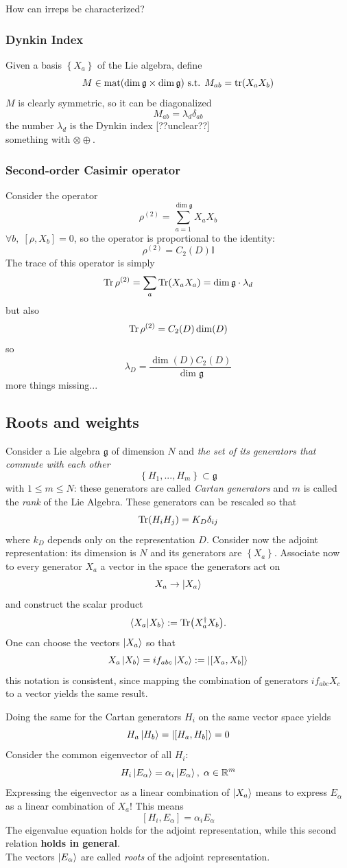 How can irreps be characterized?

\subsubsection{Dynkin Index}
Given a basis $\left\{X_a\right\}$ of the Lie algebra, define
\[
    M\in\text{mat}(\dim\mathfrak{g}\times \dim\mathfrak{g})\text{ s.t. }M_{ab}=
    \tr(X_aX_b)
\]
$M$ is clearly symmetric, so it can be diagonalized
\[
    M_{ab} = \lambda_d\delta_{ab}
\]
the number $\lambda_d$ is the Dynkin index [??unclear??]\\
something with $\otimes\oplus$.
\subsubsection{Second-order Casimir operator}
Consider the operator
\[
    \rho^{(2)} = \sum_{a=1}^{\dim\mathfrak{g}}X_aX_b
\]
$\forall b,\; \left[\rho,X_b\right]=0$, so the operator is proportional to the
identity:
\[
    \rho^{(2)}=C_2(D)\mathbb{I} 
\]
The trace of this operator is simply
\[
    \Tr\rho^{\left(2\right)} = \sum_{a}\Tr(X_aX_a) =\dim\mathfrak{g}\cdot \lambda_d
\]
but also
\[
    \Tr\rho ^{(2)} = C_2(D)\dim(D)
\]
so
\[
    \lambda_D=\frac{\dim(D)C_2(D)}{\dim\mathfrak{g}}
\]
more things missing...
\subsection{Roots and weights}
Consider a Lie algebra $\mathfrak{g}$ of dimension $N$ and \textit{the set
of its generators that commute with each other}
\[
    \left\{H_1,...,H_m\right\}\subset\mathfrak{g}
\]
with $1\leq m\leq N$: these generators are called \textit{Cartan generators} and
$m$ is called the \textit{rank} of the Lie Algebra. These generators can be
rescaled so that
\[
    \Tr(H_iH_j)=K_D\delta_{ij}
\]
where $k_D$ depends only on the representation $D$. Consider now the adjoint
representation: its dimension is $N$ and its generators are $\left\{X_a\right\}$.
Associate now to every generator $X_a$ a vector in the space the generators act on
\[
    X_a\to\ket{X_a}
\]
and construct the scalar product
\[
    \bra{X_a}\ket{X_b}:=\Tr(X_a^\dagger X_b).
\]
One can choose the vectors $\ket{X_a}$ so that
\[
    X_a\ket{X_b} = if_{abc}\ket{X_c}:=\ket{\left[X_a,X_b\right]}
\]
this notation is consistent, since mapping the combination of generators
$if_{abc}X_c$ to a vector yields the same result.

Doing the same for the Cartan generators $H_i$ on the same vector space yields
\[
    H_a\ket{H_b}=\ket{\left[H_a,H_b\right]}=0
\]
Consider the common eigenvector of all $H_i$:
\[
    H_i\ket{E_{\alpha}}=\alpha_i\ket{E_{\alpha}},\;\alpha \in\mathbb{R}^m 
\]
Expressing the eigenvector as a linear combination of $\ket{X_a}$ means to
express $E_\alpha$ as a linear combination of $X_a$! This means
\[
    \left[H_i,E_{\alpha}\right]=\alpha_iE_\alpha 
\]
The eigenvalue equation holds for the adjoint representation, while this second 
relation \textbf{holds in general}.\\
The vectors $\ket{E_\alpha}$ are called \textit{roots} of the adjoint
representation.

